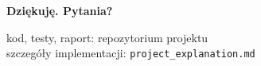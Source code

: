 \documentclass[aspectratio=169,11pt]{beamer}
\begin{document}
\begin{frame}[plain]
  \centering\vfill
  {\LARGE\bfseries Dziękuję. Pytania?}\par\bigskip
  {\color{muted} kod, testy, raport: repozytorium projektu\\
  szczegóły implementacji: \texttt{project\_explanation.md}}
  \vfill
\end{frame}
\end{document}
